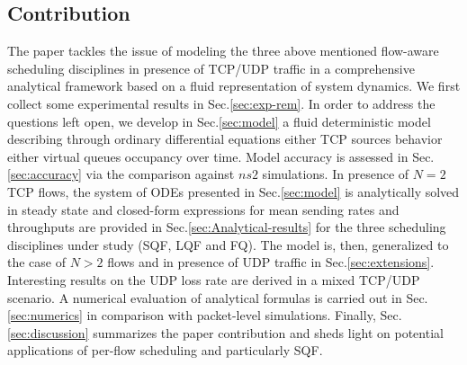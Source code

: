 \documentclass[a4paper,oneside, 11pt]{article}
\begin{document}
\subsection{Contribution}
The paper tackles the issue of modeling the three above mentioned
flow-aware scheduling disciplines in presence of TCP/UDP traffic in a comprehensive
analytical framework based on a fluid representation of system dynamics.
We first collect some experimental results in Sec.\ref{sec:exp-rem}.
In order to address the questions left open,
we develop in Sec.\ref{sec:model} a fluid deterministic model
describing through ordinary differential equations either TCP sources behavior either virtual
queues occupancy over time.
Model accuracy is assessed in Sec.\ref{sec:accuracy} via the comparison against $ns2$ simulations.
In presence of $N=2$ TCP flows, the system of ODEs presented in Sec.\ref{sec:model} is
analytically solved in steady state and
closed-form expressions for mean sending rates and throughputs are provided in Sec.\ref{sec:Analytical-results}
for the three scheduling disciplines under study (SQF, LQF and FQ).
The model is, then, generalized to the case of $N>2$ flows and
in presence of UDP traffic in Sec.\ref{sec:extensions}.
Interesting results on the UDP loss rate are derived in a mixed TCP/UDP scenario.
A numerical evaluation of analytical formulas  is carried out in Sec.\ref{sec:numerics} in comparison with packet-level simulations.
Finally, Sec.\ref{sec:discussion} summarizes the paper contribution and sheds light on potential applications of per-flow scheduling and
particularly SQF.
\end{document}
